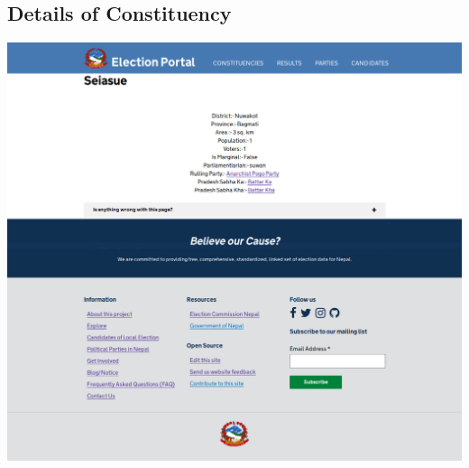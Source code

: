 \documentclass[12pt, a4paper, titlepage]{report}
\begin{document}
\subsection{Details of Constituency}
\begin{center}
\includegraphics[scale=0.25]{Details_of_Constituency.png}
\end{center}
\end{document}
